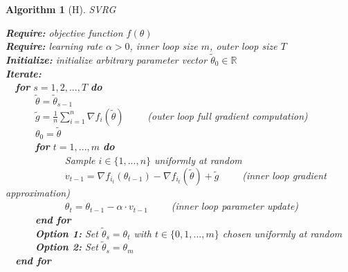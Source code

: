 \documentclass[letterpaper,11 pt]{article}
\newtheorem{algorithm}{Algorithm}
\begin{document}
\begin{algorithm}[H]
\caption{SVRG}

{\bf Require:}  objective function $f(\theta)$ \\
{\bf Require:} learning rate $\alpha>0$, inner loop size $m$, outer loop size $T$ \\
{\bf Initialize:} initialize arbitrary parameter vector $\tilde{\theta}_{0} \in \mathbb{R}$ \\
{\bf Iterate:} \\
\-\ \-\ {\bf for } $s = 1,2,...,T$ {\bf do} \\
\-\ \-\ \-\ \-\ \-\ \-\  $\tilde{\theta} = \tilde{\theta}_{s-1}$ \\
\-\ \-\ \-\ \-\ \-\ \-\   $\tilde{g} = \frac{1}{n}\sum_{i=1}^{n}{\nabla f_{i}(\tilde{\theta})}$ \-\ \-\ \-\ \-\  (\textit{outer loop full gradient computation}) \\
\-\ \-\ \-\ \-\ \-\ \-\   $\theta_0 = \tilde{\theta}$  \\
\-\ \-\ \-\ \-\ \-\ \-\  {\bf for } $t = 1,...,m$ {\bf do} \\
\-\ \-\ \-\ \-\ \-\ \-\ \-\ \-\ \-\ \-\ \-\ \-\    Sample $i \in \{1,...,n\}$ uniformly at random \\
\-\ \-\ \-\ \-\ \-\ \-\ \-\ \-\ \-\ \-\ \-\ \-\    $v_{t-1} =   \nabla f_{i_{t}}(\theta_{t-1})  - \nabla f_{i_{t}}(\tilde{\theta})  + \tilde{g}$    \-\ \-\ \-\ \-\  (\textit{inner loop gradient approximation})  \\
\-\ \-\ \-\ \-\ \-\ \-\ \-\ \-\ \-\ \-\ \-\ \-\   $\theta_{t} = \theta_{t-1} - \alpha \cdot v_{t-1} $ \-\ \-\ \-\ \-\  (\textit{inner loop parameter update}) \\
\-\ \-\ \-\ \-\ \-\ \-\ {\bf end for} \\
\-\ \-\ \-\ \-\ \-\ \-\  \textbf{Option 1: }Set $\tilde{\theta}_{s} = \theta_{t}$ with $t \in \{0,1,...,m\}$ chosen uniformly at random  \\
\-\ \-\ \-\ \-\ \-\ \-\  \textbf{Option 2: }Set $\tilde{\theta}_{s} = \theta_{m}$  \\
\-\ \-\ {\bf end for }
\end{algorithm}

\pagebreak
\end{document}
